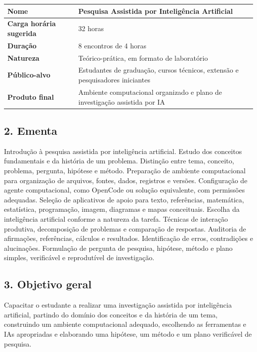 \documentclass[11pt,a4paper]{article}
\begin{document}
{\small
\begin{tabular}{|p{}|p{}|}
\hline
\textbf{Nome} & Pesquisa Assistida por Inteligência Artificial \\
\hline
\textbf{Carga horária sugerida} & 32 horas \\
\hline
\textbf{Duração} & 8 encontros de 4 horas \\
\hline
\textbf{Natureza} & Teórico-prática, em formato de laboratório \\
\hline
\textbf{Público-alvo} & Estudantes de graduação, cursos técnicos, extensão e pesquisadores iniciantes \\
\hline
\textbf{Produto final} & Ambiente computacional organizado e plano de investigação assistida por IA \\
\hline
\end{tabular}
}

\subsection*{2. Ementa}

Introdução à pesquisa assistida por inteligência artificial. Estudo dos conceitos
fundamentais e da história de um problema. Distinção entre tema, conceito, problema,
pergunta, hipótese e método. Preparação de ambiente computacional para organização de
arquivos, fontes, dados, registros e versões. Configuração de agente computacional, como
OpenCode ou solução equivalente, com permissões adequadas. Seleção de aplicativos de apoio
para texto, referências, matemática, estatística, programação, imagem, diagramas e mapas
conceituais. Escolha da inteligência artificial conforme a natureza da tarefa. Técnicas de
interação produtiva, decomposição de problemas e comparação de respostas. Auditoria de
afirmações, referências, cálculos e resultados. Identificação de erros, contradições e
alucinações. Formulação de pergunta de pesquisa, hipótese, método e plano simples,
verificável e reprodutível de investigação.

\subsection*{3. Objetivo geral}

Capacitar o estudante a realizar uma investigação assistida por inteligência artificial,
partindo do domínio dos conceitos e da história de um tema, construindo um ambiente
computacional adequado, escolhendo as ferramentas e IAs apropriadas e elaborando uma
hipótese, um método e um plano verificável de pesquisa.
\end{document}
